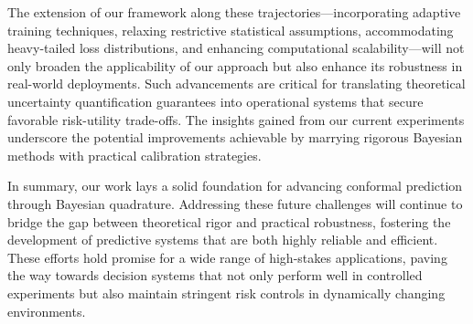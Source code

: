 \documentclass{article} %
\begin{document}
The extension of our framework along these trajectories—incorporating adaptive training techniques, relaxing restrictive statistical assumptions, accommodating heavy-tailed loss distributions, and enhancing computational scalability—will not only broaden the applicability of our approach but also enhance its robustness in real-world deployments. Such advancements are critical for translating theoretical uncertainty quantification guarantees into operational systems that secure favorable risk-utility trade-offs. The insights gained from our current experiments underscore the potential improvements achievable by marrying rigorous Bayesian methods with practical calibration strategies.

In summary, our work lays a solid foundation for advancing conformal prediction through Bayesian quadrature. Addressing these future challenges will continue to bridge the gap between theoretical rigor and practical robustness, fostering the development of predictive systems that are both highly reliable and efficient. These efforts hold promise for a wide range of high-stakes applications, paving the way towards decision systems that not only perform well in controlled experiments but also maintain stringent risk controls in dynamically changing environments.



\end{document}
